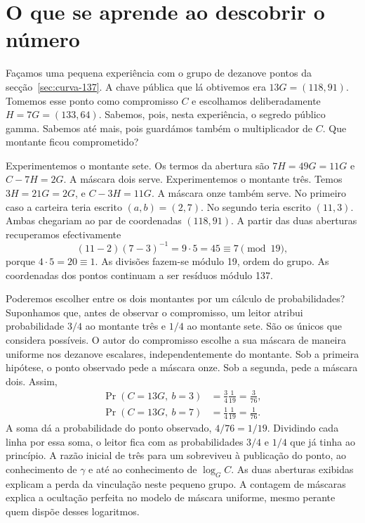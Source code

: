 \section{O que se aprende ao descobrir o número}
\label{sec:gamma-dezanove}

Façamos uma pequena experiência com o grupo de dezanove pontos da
secção~\ref{sec:curva-137}. A chave pública que lá obtivemos era
\(13G=(118,91)\). Tomemos esse ponto como compromisso \(C\) e
escolhamos deliberadamente \(H=7G=(133,64)\). Sabemos, pois, nesta
experiência, o segredo público gamma. Sabemos até mais, pois guardámos
também o multiplicador de \(C\). Que montante ficou comprometido?

Experimentemos o montante sete. Os termos da abertura são
\(7H=49G=11G\) e \(C-7H=2G\). A máscara dois serve. Experimentemos
o montante três. Temos \(3H=21G=2G\), e \(C-3H=11G\).
A máscara onze também serve. No primeiro caso a carteira teria
escrito \((a,b)=(2,7)\). No segundo teria escrito \((11,3)\).
Ambas chegariam ao par de coordenadas \((118,91)\). A partir das
duas aberturas recuperamos efectivamente
\[
       (11-2)(7-3)^{-1}=9\cdot5=45\equiv7\pmod {19},
\]
porque \(4\cdot5=20\equiv1\). As divisões fazem-se módulo 19,
ordem do grupo. As coordenadas dos pontos continuam a ser resíduos
módulo 137.

Poderemos escolher entre os dois montantes por um cálculo de
probabilidades? Suponhamos que, antes de observar o compromisso,
um leitor atribui probabilidade \(3/4\) ao montante três e \(1/4\)
ao montante sete. São os únicos que considera possíveis. O autor
do compromisso escolhe a sua máscara de maneira uniforme nos
dezanove escalares, independentemente do montante. Sob a primeira
hipótese, o ponto observado pede a máscara onze. Sob a segunda,
pede a máscara dois. Assim,
\[
\begin{aligned}
 \Pr(C=13G,\ b=3)&=\tfrac{3}{4}\tfrac1{19}=\tfrac3{76},\\
 \Pr(C=13G,\ b=7)&=\tfrac{1}{4}\tfrac1{19}=\tfrac1{76}.
\end{aligned}
\]
A soma dá a probabilidade do ponto observado, \(4/76=1/19\).
Dividindo cada linha por essa soma, o leitor fica com as
probabilidades \(3/4\) e \(1/4\) que já tinha ao princípio.
A razão inicial de três para um sobreviveu à publicação do ponto,
ao conhecimento de \(\gamma\) e até ao conhecimento de \(\log_G C\).
As duas aberturas exibidas explicam a perda da vinculação neste
pequeno grupo. A contagem de máscaras explica a ocultação perfeita
no modelo de máscara uniforme, mesmo perante quem dispõe desses
logaritmos.

